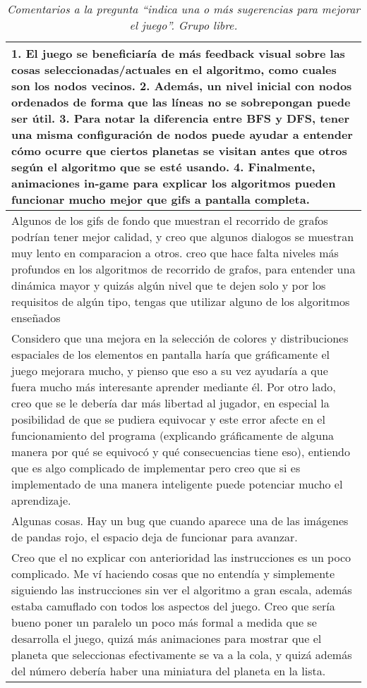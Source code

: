 \begin{table}[h]
   \centering
   \caption*{\textit{Comentarios a la pregunta ``indica una o más sugerencias para mejorar el juego''. Grupo libre.}}
   \begin{tabular}{|p{\linewidth}|}
   \hline %
   1. El juego se beneficiaría de más feedback visual sobre las cosas seleccionadas/actuales en el algoritmo, como cuales son los nodos vecinos.
   2. Además, un nivel inicial con nodos ordenados de forma que las líneas no se sobrepongan puede ser útil.
   3. Para notar la diferencia entre BFS y DFS, tener una misma configuración de nodos puede ayudar a entender cómo ocurre que ciertos planetas se visitan antes que otros según el algoritmo que se esté usando.
   4. Finalmente, animaciones in-game para explicar los algoritmos pueden funcionar mucho mejor que gifs a pantalla completa. \\\hline


   Algunos de los gifs de fondo que muestran el recorrido de grafos podrían tener mejor calidad, y creo que algunos dialogos se muestran muy lento en comparacion a otros.
   creo que hace falta niveles más profundos en los algoritmos de recorrido de grafos, para entender una dinámica mayor y quizás algún nivel que te dejen solo y por los requisitos de algún tipo, tengas que utilizar alguno de los algoritmos enseñados\\\hline

   Considero que una mejora en la selección de colores y distribuciones espaciales de los elementos en pantalla haría que gráficamente el juego mejorara mucho, y pienso que eso a su vez ayudaría a que fuera mucho más interesante aprender mediante él. Por otro lado, creo que se le debería dar más libertad al jugador, en especial la posibilidad de que se pudiera equivocar y este error afecte en el funcionamiento del programa (explicando gráficamente de alguna manera por qué se equivocó y qué consecuencias tiene eso), entiendo que es algo complicado de implementar pero creo que si es implementado de una manera inteligente puede potenciar mucho el aprendizaje.\\\hline

   Algunas cosas. Hay un bug que cuando aparece una de las imágenes de pandas rojo, el espacio deja de funcionar para avanzar. \\\hline 
   
   Creo que el no explicar con anterioridad las instrucciones es un poco complicado. Me ví haciendo cosas que no entendía y simplemente siguiendo las instrucciones sin ver el algoritmo a gran escala, además estaba camuflado con todos los aspectos del juego. Creo que sería bueno poner un paralelo un poco más formal a medida que se desarrolla el juego, quizá más animaciones para mostrar que el planeta que seleccionas efectivamente se va a la cola, y quizá además del número debería haber una miniatura del planeta en la lista.  \\\hline
   

\end{tabular}
\end{table}
